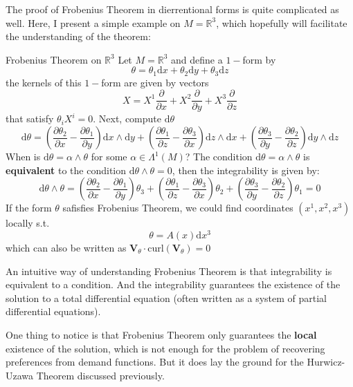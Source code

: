 The proof of Frobenius Theorem in dierrentional forms is quite complicated as well. Here, I present a simple example on $M=\mathbb{R}^3$, which hopefully will facilitate the understanding of the theorem:
\begin{example}{Frobenius Theorem on $\mathbb{R}^3$}
    Let $M=\mathbb{R}^3$ and define a $1-$form by
    $$
        \theta = \theta_1 \mathrm{d}x + \theta_2\mathrm{d}y + \theta_3 \mathrm{d}z
    $$
    the kernels of this $1-$form are given by vectors
    $$
        X = X^1 \frac{\partial}{\partial x}+ X^2 \frac{\partial}{\partial y} +X^3 \frac{\partial}{\partial z}
    $$
    that satisfy $\theta_i X^i = 0$. Next, compute $\mathrm{d}\theta$
    $$
    \mathrm{d}\theta = \left( \frac{\partial\theta_2}{\partial x}-\frac{\partial \theta_1}{\partial y}\right) \mathrm{d}x\wedge \mathrm{d}y + \left(\frac{\partial\theta_1}{\partial z}-\frac{\partial \theta_3}{\partial x}\right) \mathrm{d}z\wedge \mathrm{d}x + \left(\frac{\partial\theta_3}{\partial y}-\frac{\partial \theta_2}{\partial z}\right) \mathrm{d}y\wedge \mathrm{d}z
    $$
    When is $\mathrm{d}\theta = \alpha \wedge \theta$ for some $\alpha\in\Lambda^1(M)$? The condition $\mathrm{d}\theta = \alpha\wedge \theta$ is \textbf{equivalent} to the condition $\mathrm{d}\theta \wedge \theta=0$, then the integrability is given by:
    $$
    \mathrm{d}\theta \wedge \theta = \left(\frac{\partial\theta_2}{\partial x}-\frac{\partial \theta_1}{\partial y}\right) \theta_3 + \left(\frac{\partial\theta_1}{\partial z}-\frac{\partial \theta_3}{\partial x}\right) \theta_2 + \left(\frac{\partial\theta_3}{\partial y}-\frac{\partial \theta_2}{\partial z}\right) \theta_1 =0  
    $$
    If the form $\theta$ safisfies Frobenius Theorem, we could find coordinates $(x^1,x^2,x^3)$ locally s.t.
    $$
        \theta = A(x)\mathrm{d}x^3
    $$
    which can also be written as $\mathbf{V}_{\theta} \cdot \mathrm{curl}(\mathbf{V}_\theta)= 0$
\end{example} 

An intuitive way of understanding Frobenius Theorem is that integrability is equivalent to a  condition. And the integrability guarantees the existence of the solution to a total differential equation (often written as a system of partial differential equations).

One thing to notice is that Frobenius Theorem only guarantees the \textbf{local} existence of the solution, which is not enough for the problem of recovering preferences from demand functions. But it does lay the ground for the Hurwicz-Uzawa Theorem discussed previously.